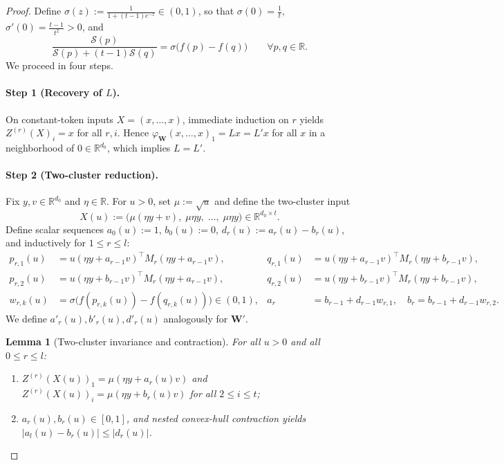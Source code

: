\documentclass[11pt]{article}
\theoremstyle{plain}
\newtheorem{lemma}{Lemma}
\theoremstyle{definition}
\theoremstyle{remark}
\newcommand{\R}{\mathbb{R}}
\newcommand{\calS}{\mathcal{S}}
\newcommand{\bfW}{\mathbf{W}}
\begin{document}
\begin{proof}
Define $\sigma(z) := \frac{1}{1 + (t - 1)e^{-z}} \in (0, 1)$, so that $\sigma(0) = \frac{1}{t}$, $\sigma'(0) = \frac{t - 1}{t^2} > 0$, and
\[
\frac{\calS(p)}{\calS(p) + (t - 1)\calS(q)} = \sigma\bigl(f(p) - f(q)\bigr) \qquad \forall p, q \in \R.
\]
We proceed in four steps.

\paragraph{Step 1 (Recovery of $L$).}
On constant-token inputs $X = (x, \dots, x)$, immediate induction on $r$ yields $Z^{(r)}(X)_i = x$ for all $r, i$. Hence $\varphi_{\bfW}(x, \dots, x)_1 = L x = L' x$ for all $x$ in a neighborhood of $0 \in \R^{d_0}$, which implies $L = L'$.

\paragraph{Step 2 (Two-cluster reduction).}
Fix $y, v \in \R^{d_0}$ and $\eta \in \R$. For $u > 0$, set $\mu := \sqrt{u}$ and define the two-cluster input
\[
X(u) := \bigl(\mu(\eta y + v),\; \mu\eta y,\; \dots,\; \mu\eta y\bigr) \in \R^{d_0 \times t}.
\]
Define scalar sequences $a_0(u) := 1$, $b_0(u) := 0$, $d_r(u) := a_r(u) - b_r(u)$, and inductively for $1 \le r \le l$:
\begin{align*}
p_{r,1}(u) &= u(\eta y + a_{r-1} v)^\top M_r (\eta y + a_{r-1} v),
& q_{r,1}(u) &= u(\eta y + a_{r-1} v)^\top M_r (\eta y + b_{r-1} v), \\
p_{r,2}(u) &= u(\eta y + b_{r-1} v)^\top M_r (\eta y + a_{r-1} v),
& q_{r,2}(u) &= u(\eta y + b_{r-1} v)^\top M_r (\eta y + b_{r-1} v), \\
w_{r,k}(u) &= \sigma\bigl(f(p_{r,k}(u)) - f(q_{r,k}(u))\bigr) \in (0, 1),
& a_r &= b_{r-1} + d_{r-1} w_{r,1}, \quad b_r = b_{r-1} + d_{r-1} w_{r,2}.
\end{align*}
We define $a'_r(u), b'_r(u), d'_r(u)$ analogously for $\bfW'$.

\begin{lemma}[Two-cluster invariance and contraction]\label{lem:twocluster}
For all $u > 0$ and all $0 \le r \le l$:
\begin{enumerate}[label=(\arabic*),leftmargin=2.2em,itemsep=1pt]
    \item $Z^{(r)}(X(u))_1 = \mu(\eta y + a_r(u) v)$ and $Z^{(r)}(X(u))_i = \mu(\eta y + b_r(u) v)$ for all $2 \le i \le t$;
    \item $a_r(u), b_r(u) \in [0, 1]$, and nested convex-hull contraction yields $|a_l(u) - b_r(u)| \le |d_r(u)|$.
\end{enumerate}
\end{lemma}


\end{proof}
\end{document}
